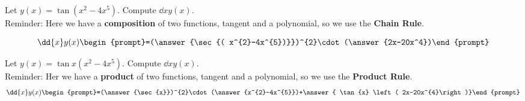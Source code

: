 \documentclass{ximera}
\author{Bart Snapp\and Nela lakos}
\begin{document}
\begin{exercise}
Let $y(x) = \tan{ \left( x^{2}-4x^{5}\right)}$. Compute $\dd{x}y(x)$.\\

Reminder: Here we have a \textbf{composition} of two functions, tangent and a polynomial, so we use the \textbf{Chain Rule}.

\[
\dd{x}y(x)
\begin{prompt}=(\answer{\sec{( x^{2}-4x^{5})}})^{2}\cdot(\answer{2x-20x^4})\end{prompt}
\]

\end{exercise}
\begin{exercise}
Let $y(x) = \tan{x} \left( x^{2}-4x^{5}\right)$. Compute $\dd{x}y(x)$.\\

Reminder: Her we have a \textbf{product} of two functions, tangent and a polynomial, so we use the\textbf{ Product Rule}.
\[
\dd{x}y(x)
\begin{prompt}=(\answer{\sec{x}})^{2}\cdot(\answer{x^{2}-4x^{5}})+\answer{ \tan{x} \left( 2x-20x^{4}\right)}\end{prompt}
\]
\end{exercise}
\end{document}
